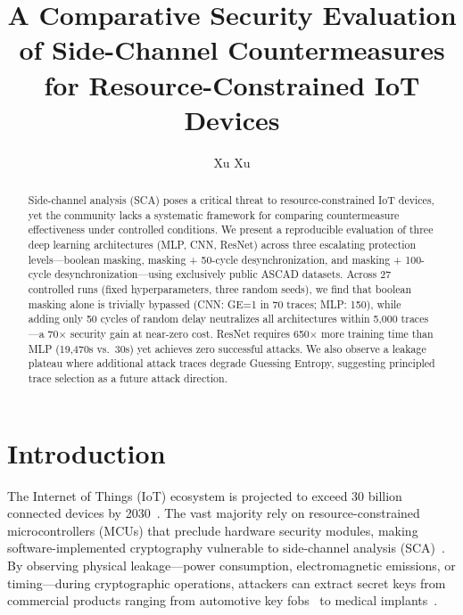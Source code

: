 \documentclass[runningheads]{llncs}
\begin{document}
\title{A Comparative Security Evaluation of Side-Channel Countermeasures\\for Resource-Constrained IoT Devices}

\author{Xu Xu}



\maketitle

\begin{abstract}
Side-channel analysis (SCA) poses a critical threat to resource-constrained IoT devices, yet the community lacks a systematic framework for comparing countermeasure effectiveness under controlled conditions. We present a reproducible evaluation of three deep learning architectures (MLP, CNN, ResNet) across three escalating protection levels---boolean masking, masking + 50-cycle desynchronization, and masking + 100-cycle desynchronization---using exclusively public ASCAD datasets. Across 27 controlled runs (fixed hyperparameters, three random seeds), we find that boolean masking alone is trivially bypassed (CNN: GE=1 in 70 traces; MLP: 150), while adding only 50 cycles of random delay neutralizes all architectures within 5,000 traces---a 70$\times$ security gain at near-zero cost. ResNet requires 650$\times$ more training time than MLP (19,470s vs.\ 30s) yet achieves zero successful attacks. We also observe a leakage plateau where additional attack traces degrade Guessing Entropy, suggesting principled trace selection as a future attack direction.

\end{abstract}

\section{Introduction}

The Internet of Things (IoT) ecosystem is projected to exceed 30 billion connected devices by 2030~\cite{iot_forecast_2024}. The vast majority rely on resource-constrained microcontrollers (MCUs) that preclude hardware security modules, making software-implemented cryptography vulnerable to side-channel analysis (SCA)~\cite{kocher1999differential}. By observing physical leakage---power consumption, electromagnetic emissions, or timing---during cryptographic operations, attackers can extract secret keys from commercial products ranging from automotive key fobs~\cite{smartlock_sca_2020} to medical implants~\cite{medical_implant_sca}.
\end{document}

